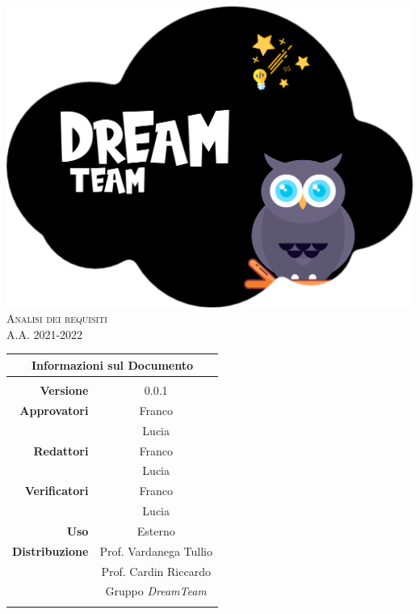 \thispagestyle{empty}
\begin{titlepage}
	\begin{center}
		
		\includegraphics[scale = 0.05]{../latex/images/DreamTeam.png}\\[1.5cm]
\Huge \textsc{Analisi dei requisiti \doctitle{}}\\ [0.75cm]                          
\Large \textsf{A.A. 2021-2022} \\ 

\begin{table}[htbp]
\centering
\begin{tabular}{r|c}
\multicolumn{2}{c}{\textbf{Informazioni sul Documento}} \\
\hline \\
\textbf{Versione} & 0.0.1 \\ \rule{0pt}{3ex}    
\textbf{Approvatori} & Franco \\ \rule{0pt}{2ex}   
& Lucia \\ \rule{0pt}{3ex}    
\textbf{Redattori} & Franco \\ \rule{0pt}{2ex}   
& Lucia \\ \rule{0pt}{3ex}    
\textbf{Verificatori} & Franco \\ \rule{0pt}{2ex}   
& Lucia \\ \rule{0pt}{3ex}    
\textbf{Uso} & Esterno \\ \rule{0pt}{3ex}    
\textbf{Distribuzione} & Prof. Vardanega Tullio \\ \rule{0pt}{2ex}   
& Prof. Cardin Riccardo \\ \rule{0pt}{2ex}   
& Gruppo \textit{DreamTeam} \\ \rule{0pt}{0.1cm}   
\end{tabular} \\ [0.5cm]
\end{table}
  

\end{center}
\end{titlepage}
